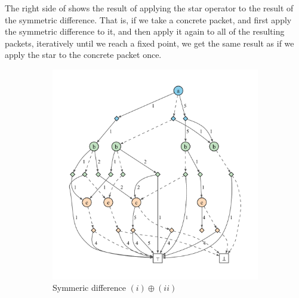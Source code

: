 \documentclass[acmsmall,dvipsnames,nonacm]{acmart}
\begin{document}
The right side of  shows the result of applying the
star operator to the result of the symmetric difference.  That is, if
we take a concrete packet, and first apply the symmetric difference
\SPPn{} to it, and then apply it again to all of the resulting
packets, iteratively until we reach a fixed point, we get the same
result as if we apply the star \SPPn{} to the concrete packet once.

\renewcommand\thesubfigure{\arabic{subfigure}}
\begin{figure}
    \centering
    \begin{subfigure}[b]{0.6\textwidth}
        \centering
        \includegraphics[scale=0.5]{viz/spp1xor2cp.pdf}
        \caption{Symmeric difference $(i) \oplus (ii)$}
        \label{fig:spp1xor2}
    \end{subfigure}
    \hfill %
    \begin{subfigure}[b]{0.39\textwidth}
        \centering

\end{subfigure}
\end{figure}
\end{document}
